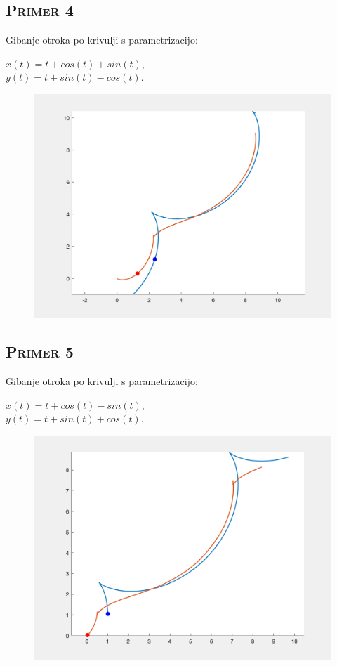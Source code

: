 \documentclass[a4paper,12pt]{article}
\begin{document}
    \newpage
    \subsection{\textsc{Primer 4}}
    Gibanje otroka po krivulji s parametrizacijo:
    \begin{center}
    $x(t) = t + cos(t) + sin(t)$, \\
    $y(t) = t + sin(t) - cos(t)$. 
    \end{center}      
    \begin{figure}[!h]
        \centering
        \includegraphics[scale=0.4]{Primer4}
    \end{figure}
    
    \subsection{\textsc{Primer 5}}
    Gibanje otroka po krivulji s parametrizacijo:
    \begin{center}
    $x(t) = t + cos(t) - sin(t)$, \\
    $y(t) = t + sin(t) + cos(t)$. 
    \end{center}      
    \begin{figure}[!h]
        \centering
        \includegraphics[scale=0.4]{Primer5}
    \end{figure}
\end{document}
